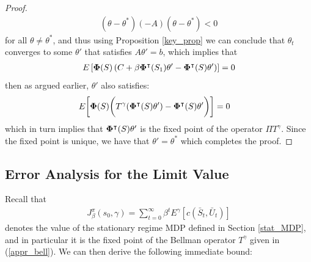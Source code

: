 \documentclass[11pt]{article}
\begin{document}
\begin{proof}
 \begin{align*}
 (\theta-\theta^*)(-A)(\theta-\theta^*)<0
 \end{align*}
 for all $\theta\neq\theta^*$, and thus using Proposition \ref{key_prop} we can conclude that $\theta_t$ converges to some $\theta'$ that satisfies $A\theta'=b$, which implies that
 \begin{align*}
 E\left[{\bf \Phi}(S)\left( C+\beta {\bf \Phi}^\intercal(S_{1})\theta'- {\bf \Phi}^\intercal(S)\theta' \right) \right]=0
 \end{align*}
 then as argued earlier, $\theta'$ also satisfies:
 \begin{align*}
 &E\bigg[{\bf \Phi}(S)\bigg( T^\gamma({\bf \Phi}^\intercal(S)\theta' )- {\bf \Phi}^\intercal(S)\theta' \bigg) \bigg]=0
 \end{align*}
 which in turn implies that ${\bf \Phi}^\intercal(S)\theta' $ is the fixed point of the operator $\Pi T^\gamma$. Since the fixed point is unique, we have that $\theta'=\theta^*$ which completes the proof.


\end{proof}

\subsection{Error Analysis for the Limit Value}\label{err_anal_sec}

Recall that \begin{align*}
J^\pi_\beta(s_0,\gamma)= \sum_{t=0}^\infty \beta^t E^\gamma [c(\bar{S}_t,\bar{U}_t)]
\end{align*}
denotes the value of the stationary regime MDP defined in Section \ref{stat_MDP}, and in particular it is the fixed point of the Bellman operator $T^\gamma$ given in (\ref{appr_bell}). We can then derive the following immediate bound:
\end{document}
